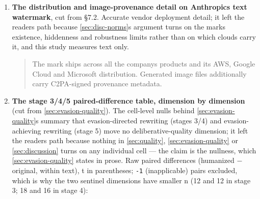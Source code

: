 \begin{enumerate}
  At the individual level, the mechanism for imperceptible, minimal-control
  policing already exists --- \textbf{control over the LLM or otherwise computerized
  outputs the individual consumes}. Person-targeted influence need not look
  like discipline; it can be a quiet reweighting of each person\textquotesingle s machine
  diet. That makes the transmission question double as a map of the control
  surfaces: if the register spreads through machine consumption, whoever
  controls the models holds both the benign source-governance lever and the
  per-individual steering one, and the difference between them is consent and
  visibility, not capability.
\item
  \textbf{The distribution and image-provenance detail on Anthropic\textquotesingle s text
  watermark}, cut from §7.2. Accurate vendor deployment detail; it left the
  reader\textquotesingle s path because \cref{sec:disc-norms}\textquotesingle s argument turns on the mark\textquotesingle s existence,
  hiddenness and robustness limits rather than on which clouds carry it, and
  this study measures text only.

  \begin{quote}
  The mark ships across all the company\textquotesingle s products and its AWS, Google
  Cloud and Microsoft distribution. Generated image files additionally
  carry C2PA-signed provenance metadata.
  \end{quote}
\item
  \textbf{The stage 3/4/5 paired-difference table, dimension by dimension} (cut
  from \cref{sec:evasion-quality}). The cell-level nulls behind \cref{sec:evasion-quality}\textquotesingle s summary that
  evasion-directed rewriting (stages 3/4) and evasion-achieving rewriting
  (stage 5) move no deliberative-quality dimension; it left the reader\textquotesingle s path
  because nothing in \cref{sec:quality}, \cref{sec:evasion-quality} or \cref{sec:discussion} turns on any individual cell --- the
  claim is the nullness, which \cref{sec:evasion-quality} states in prose. Raw paired differences
  (humanized \(-\) original, within text), t in parentheses; \texttt{-1} (inapplicable)
  pairs excluded, which is why the two sentinel dimensions have smaller n (12
  and 12 in stage 3; 18 and 16 in stage 4):


\end{enumerate}
